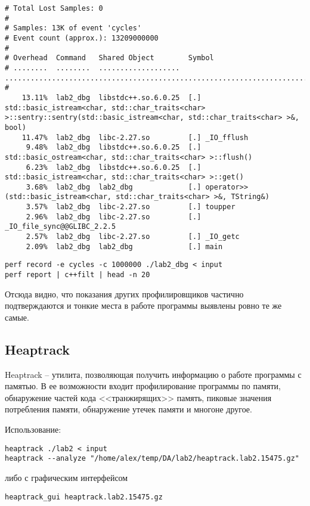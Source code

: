 \documentclass[12pt]{article}
\begin{document}
\begin{small}
\footnotesize
\begin{verbatim}
# Total Lost Samples: 0
#
# Samples: 13K of event 'cycles'
# Event count (approx.): 13209000000
#
# Overhead  Command   Shared Object        Symbol                                                                                                                              
# ........  ........  ...................  ....................................................................................................................................
#
    13.11%  lab2_dbg  libstdc++.so.6.0.25  [.] std::basic_istream<char, std::char_traits<char> >::sentry::sentry(std::basic_istream<char, std::char_traits<char> >&, bool)
    11.47%  lab2_dbg  libc-2.27.so         [.] _IO_fflush
     9.48%  lab2_dbg  libstdc++.so.6.0.25  [.] std::basic_ostream<char, std::char_traits<char> >::flush()
     6.23%  lab2_dbg  libstdc++.so.6.0.25  [.] std::basic_istream<char, std::char_traits<char> >::get()
     3.68%  lab2_dbg  lab2_dbg             [.] operator>>(std::basic_istream<char, std::char_traits<char> >&, TString&)
     3.57%  lab2_dbg  libc-2.27.so         [.] toupper
     2.96%  lab2_dbg  libc-2.27.so         [.] _IO_file_sync@@GLIBC_2.2.5
     2.57%  lab2_dbg  libc-2.27.so         [.] _IO_getc
     2.09%  lab2_dbg  lab2_dbg             [.] main

\end{verbatim}
\end{small}

\begin{lstlisting}
perf record -e cycles -c 1000000 ./lab2_dbg < input 
perf report | c++filt | head -n 20
\end{lstlisting}

Отсюда видно, что показания других профилировщиков частично подтверждаются и тонкие места в работе программы выявлены ровно те же самые.

\subsection*{Heaptrack}
Heaptrack -- утилита, позволяющая получить информацию о работе программы с памятью. В ее возможности входит профилирование программы по памяти, обнаружение частей кода <<транжирящих>> память, пиковые значения потребления памяти, обнаружение утечек памяти и многоне другое.

Использование:
\begin{lstlisting}
heaptrack ./lab2 < input 
heaptrack --analyze "/home/alex/temp/DA/lab2/heaptrack.lab2.15475.gz"
\end{lstlisting}
либо с графическим интерфейсом 
\begin{lstlisting}
heaptrack_gui heaptrack.lab2.15475.gz 
\end{lstlisting}
\end{document}
